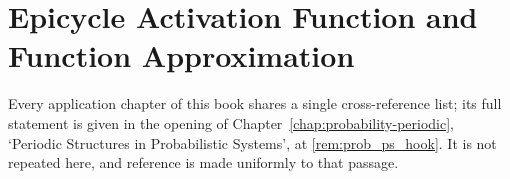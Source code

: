 \chapter{Epicycle Activation Function and Function Approximation}
\label{chap:epicycle-activation}

\begin{remark}\label{rem:epicycle_act_ps_hook}
Every application chapter of this book shares a single cross-reference list; its full statement is given in the opening of Chapter~\ref{chap:probability-periodic}, `Periodic Structures in Probabilistic Systems', at \cref{rem:prob_ps_hook}. It is not repeated here, and reference is made uniformly to that passage.
\end{remark}

